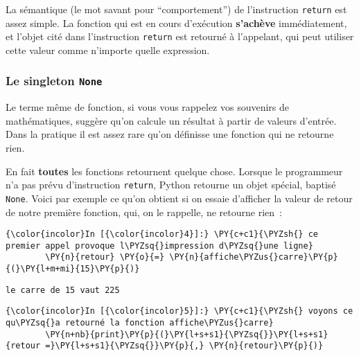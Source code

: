     La sémantique (le mot savant pour ``comportement'') de l'instruction
\texttt{return} est assez simple. La fonction qui est en cours
d'exécution \textbf{s'achève} immédiatement, et l'objet cité dans
l'instruction \texttt{return} est retourné à l'appelant, qui peut
utiliser cette valeur comme n'importe quelle expression.

    \hypertarget{le-singleton-none}{%
\subsubsection{\texorpdfstring{Le singleton
\texttt{None}}{Le singleton None}}\label{le-singleton-none}}

    Le terme même de fonction, si vous vous rappelez vos souvenirs de
mathématiques, suggère qu'on calcule un résultat à partir de valeurs
d'entrée. Dans la pratique il est assez rare qu'on définisse une
fonction qui ne retourne rien.

    En fait \textbf{toutes} les fonctions retournent quelque chose. Lorsque
le programmeur n'a pas prévu d'instruction \texttt{return}, Python
retourne un objet spécial, baptisé \texttt{None}. Voici par exemple ce
qu'on obtient si on essaie d'afficher la valeur de retour de notre
première fonction, qui, on le rappelle, ne retourne rien~:

    \begin{Verbatim}[commandchars=\\\{\},frame=single,framerule=0.3mm,rulecolor=\color{cellframecolor}]
{\color{incolor}In [{\color{incolor}4}]:} \PY{c+c1}{\PYZsh{} ce premier appel provoque l\PYZsq{}impression d\PYZsq{}une ligne}
        \PY{n}{retour} \PY{o}{=} \PY{n}{affiche\PYZus{}carre}\PY{p}{(}\PY{l+m+mi}{15}\PY{p}{)}
\end{Verbatim}


    \begin{Verbatim}[commandchars=\\\{\},frame=single,framerule=0.3mm,rulecolor=\color{cellframecolor}]
le carre de 15 vaut 225
\end{Verbatim}

    \begin{Verbatim}[commandchars=\\\{\},frame=single,framerule=0.3mm,rulecolor=\color{cellframecolor}]
{\color{incolor}In [{\color{incolor}5}]:} \PY{c+c1}{\PYZsh{} voyons ce qu\PYZsq{}a retourné la fonction affiche\PYZus{}carre}
        \PY{n+nb}{print}\PY{p}{(}\PY{l+s+s1}{\PYZsq{}}\PY{l+s+s1}{retour =}\PY{l+s+s1}{\PYZsq{}}\PY{p}{,} \PY{n}{retour}\PY{p}{)}
\end{Verbatim}



